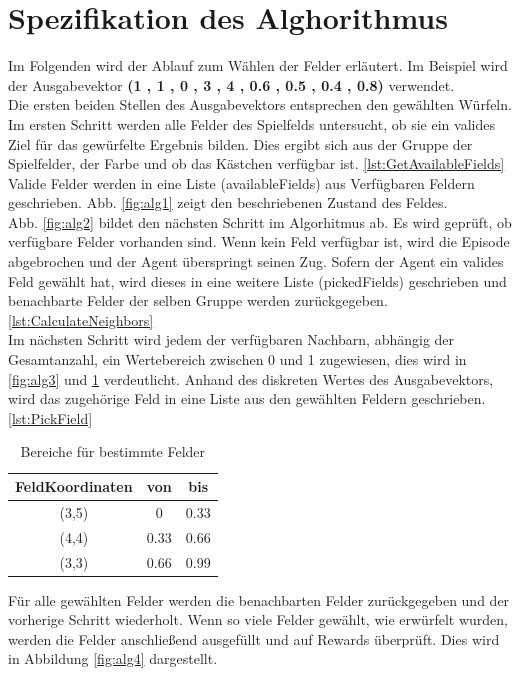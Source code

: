 \clearpage
\section{Spezifikation des Alghorithmus}
Im Folgenden wird der Ablauf zum Wählen der Felder erläutert. Im Beispiel wird der Ausgabevektor \textbf{(1 , 1 , 0 , 3 , 4 , 0.6 , 0.5 , 0.4 , 0.8)} verwendet. \\
Die ersten beiden Stellen des Ausgabevektors entsprechen den gewählten Würfeln.
Im ersten Schritt werden alle Felder des Spielfelds untersucht, ob sie ein valides Ziel für das gewürfelte Ergebnis bilden. Dies ergibt sich aus der Gruppe der Spielfelder, der Farbe und ob das Kästchen verfügbar ist. \ref{lst:GetAvailableFields}
Valide Felder werden in eine Liste (availableFields) aus Verfügbaren Feldern geschrieben. Abb. \ref{fig:alg1} zeigt den beschriebenen Zustand des Feldes.\\

Abb. \ref{fig:alg2} bildet den nächsten Schritt im Algorhitmus ab.
Es wird geprüft, ob verfügbare Felder vorhanden sind.
Wenn kein Feld verfügbar ist, wird die Episode abgebrochen und der Agent überspringt seinen Zug.
Sofern der Agent ein valides Feld gewählt hat, wird dieses in eine weitere Liste (pickedFields) geschrieben und benachbarte Felder der selben Gruppe werden zurückgegeben. \ref{lst:CalculateNeighbors} \\

Im nächsten Schritt wird jedem der verfügbaren Nachbarn, abhängig der Gesamtanzahl, ein Wertebereich zwischen 0 und 1 zugewiesen, dies wird in \ref{fig:alg3} und \ref{tab:field_ranges} verdeutlicht. Anhand des diskreten Wertes des Ausgabevektors, wird das zugehörige Feld in eine Liste aus den gewählten Feldern geschrieben. \ref{lst:PickField}
\begin{table}[!h]
    \centering
    \begin{tabular}{|c|c|c|}
    \hline
    \textbf{FeldKoordinaten} & \textbf{von} & \textbf{bis} \\
    \hline
    (3,5) & 0 & 0.33 \\
    \hline
    (4,4) & 0.33 & 0.66 \\
    \hline
    (3,3) & 0.66 & 0.99 \\
    \hline
    \end{tabular}
    \caption{Bereiche für bestimmte Felder}
    \label{tab:field_ranges}
\end{table}

Für alle gewählten Felder werden die benachbarten Felder zurückgegeben und der vorherige Schritt wiederholt.
Wenn so viele Felder gewählt, wie erwürfelt wurden, werden die Felder anschließend ausgefüllt und auf Rewards überprüft. Dies wird in Abbildung \ref{fig:alg4} dargestellt.

